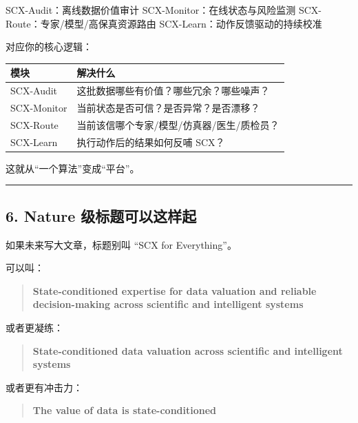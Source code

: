 \documentclass[
  12pt,
]{ctexart}
\newenvironment{Shaded}{}{}
\newcommand{\NormalTok}[1]{#1}
\begin{document}
\begin{Shaded}
\begin{Highlighting}[]
\NormalTok{SCX{-}Audit：离线数据价值审计}
\NormalTok{SCX{-}Monitor：在线状态与风险监测}
\NormalTok{SCX{-}Route：专家/模型/高保真资源路由}
\NormalTok{SCX{-}Learn：动作反馈驱动的持续校准}
\end{Highlighting}
\end{Shaded}

对应你的核心逻辑：

\begin{longtable}[]{@{}ll@{}}
\toprule\noalign{}
模块 & 解决什么 \\
\midrule\noalign{}
\endhead
\bottomrule\noalign{}
\endlastfoot
SCX-Audit & 这批数据哪些有价值？哪些冗余？哪些噪声？ \\
SCX-Monitor & 当前状态是否可信？是否异常？是否漂移？ \\
SCX-Route & 当前该信哪个专家/模型/仿真器/医生/质检员？ \\
SCX-Learn & 执行动作后的结果如何反哺 SCX？ \\
\end{longtable}

这就从``一个算法''变成``平台''。

\begin{center}\rule{0.5\linewidth}{0.5pt}\end{center}

\subsection{6. Nature
级标题可以这样起}\label{nature-ux7ea7ux6807ux9898ux53efux4ee5ux8fd9ux6837ux8d77}

如果未来写大文章，标题别叫 ``SCX for Everything''。

可以叫：

\begin{quote}
\textbf{State-conditioned expertise for data valuation and reliable
decision-making across scientific and intelligent systems}
\end{quote}

或者更凝练：

\begin{quote}
\textbf{State-conditioned data valuation across scientific and
intelligent systems}
\end{quote}

或者更有冲击力：

\begin{quote}
\textbf{The value of data is state-conditioned}
\end{quote}
\end{document}

